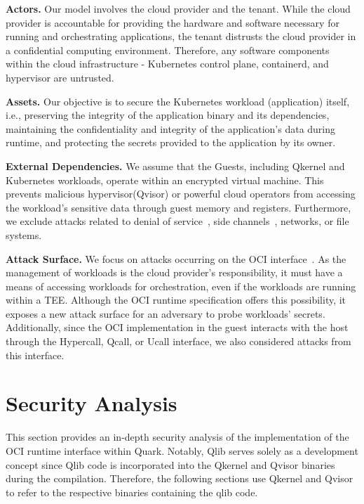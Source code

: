 \textbf{Actors.} Our model involves the cloud provider and the tenant. While the cloud provider is accountable for providing the hardware and software necessary for running and orchestrating applications, the tenant distrusts the cloud provider 
in a confidential computing environment. Therefore, any software components within the cloud infrastructure - Kubernetes control plane\cite*{k8s}, containerd\cite*{containerd}, and hypervisor are untrusted.

\textbf{Assets.} Our objective is to secure the Kubernetes workload (application) itself, i.e., preserving the integrity of the application binary and its dependencies, maintaining the confidentiality and integrity of the application's data during runtime, and protecting the secrets provided to the application by its owner.

\textbf{External Dependencies.} We assume that the Guests, including Qkernel and Kubernetes workloads, operate within an encrypted virtual machine. This prevents malicious hypervisor(Qvisor) or powerful cloud operators from accessing the workload's sensitive 
data through guest memory and registers. Furthermore, we exclude attacks related to denial of service~\cite*{DOS_ATTACK}, side channels~\cite*{217454}, networks, or file systems.


\textbf{Attack Surface.} We focus on attacks occurring on the OCI interface~\cite*{oci-runtime-spec}. As the management of workloads is the cloud provider's responsibility, it must have a means of accessing workloads for orchestration, even if the 
workloads are running within a TEE. Although the OCI runtime specification offers this possibility, it exposes a new attack surface for an adversary to probe workloads' secrets. Additionally, since the OCI  implementation in the guest interacts with 
the host through the Hypercall, Qcall, or Ucall interface, we also considered attacks from this interface.


\section{Security Analysis}
\label{sec:security_analysis}

This section provides an in-depth security analysis of the implementation of the OCI runtime interface within Quark.  Notably, Qlib serves solely as a development concept since Qlib code is incorporated into the Qkernel and Qvisor binaries during 
the compilation. Therefore, the following sections use Qkernel and Qvisor to refer to the respective binaries containing the qlib code.

